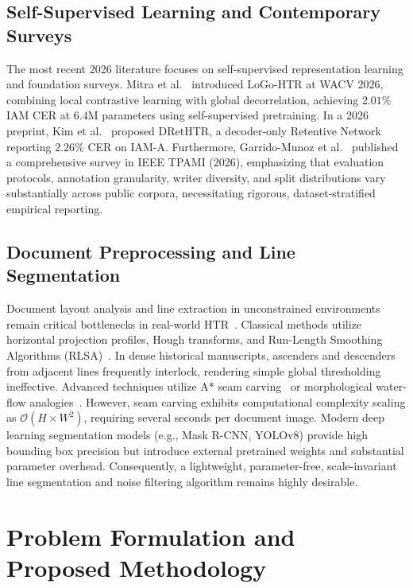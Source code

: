 \documentclass{IEEEtran}
\begin{document}
\subsection{Self-Supervised Learning and Contemporary Surveys}

The most recent 2026 literature focuses on self-supervised representation learning and foundation surveys. Mitra et al.~\cite{mitra2026logo} introduced LoGo-HTR at WACV 2026, combining local contrastive learning with global decorrelation, achieving $2.01\%$ IAM CER at $6.4\text{M}$ parameters using self-supervised pretraining. In a 2026 preprint, Kim et al.~\cite{kim2026drethtr} proposed DRetHTR, a decoder-only Retentive Network reporting $2.26\%$ CER on IAM-A. Furthermore, Garrido-Munoz et al.~\cite{garridomunoz2026survey} published a comprehensive survey in IEEE TPAMI (2026), emphasizing that evaluation protocols, annotation granularity, writer diversity, and split distributions vary substantially across public corpora, necessitating rigorous, dataset-stratified empirical reporting.

\subsection{Document Preprocessing and Line Segmentation}

Document layout analysis and line extraction in unconstrained environments remain critical bottlenecks in real-world HTR~\cite{louloudis2009}. Classical methods utilize horizontal projection profiles, Hough transforms, and Run-Length Smoothing Algorithms (RLSA)~\cite{wahl1982}. In dense historical manuscripts, ascenders and descenders from adjacent lines frequently interlock, rendering simple global thresholding ineffective. Advanced techniques utilize A* seam carving~\cite{shapiro2013} or morphological water-flow analogies~\cite{saabni2014}. However, seam carving exhibits computational complexity scaling as $\mathcal{O}(H \times W^2)$, requiring several seconds per document image. Modern deep learning segmentation models (e.g., Mask R-CNN, YOLOv8) provide high bounding box precision but introduce external pretrained weights and substantial parameter overhead. Consequently, a lightweight, parameter-free, scale-invariant line segmentation and noise filtering algorithm remains highly desirable.

\section{Problem Formulation and Proposed Methodology}
\end{document}

